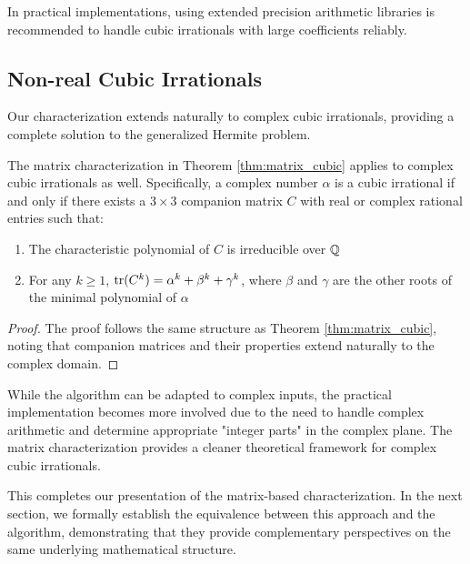 \begin{remark}
In practical implementations, using extended precision arithmetic libraries is recommended to handle cubic irrationals with large coefficients reliably.
\end{remark}

\subsection{Non-real Cubic Irrationals}

Our characterization extends naturally to complex cubic irrationals, providing a complete solution to the generalized Hermite problem.

\begin{theorem}\label{thm:complex_cubic}
The matrix characterization in Theorem \ref{thm:matrix_cubic} applies to complex cubic irrationals as well. Specifically, a complex number $\alpha$ is a cubic irrational if and only if there exists a $3 \times 3$ companion matrix $C$ with real or complex rational entries such that:
\begin{enumerate}
    \item The characteristic polynomial of $C$ is irreducible over $\mathbb{Q}$
    \item For any $k \geq 1$, $\operatorname{tr}(C^k) = \alpha^k + \beta^k + \gamma^k$, where $\beta$ and $\gamma$ are the other roots of the minimal polynomial of $\alpha$
\end{enumerate}
\end{theorem}

\begin{proof}
The proof follows the same structure as Theorem \ref{thm:matrix_cubic}, noting that companion matrices and their properties extend naturally to the complex domain.
\end{proof}

\begin{remark}
While the \HAPD{} algorithm can be adapted to complex inputs, the practical implementation becomes more involved due to the need to handle complex arithmetic and determine appropriate "integer parts" in the complex plane. The matrix characterization provides a cleaner theoretical framework for complex cubic irrationals.
\end{remark}

This completes our presentation of the matrix-based characterization. In the next section, we formally establish the equivalence between this approach and the \HAPD{} algorithm, demonstrating that they provide complementary perspectives on the same underlying mathematical structure.
